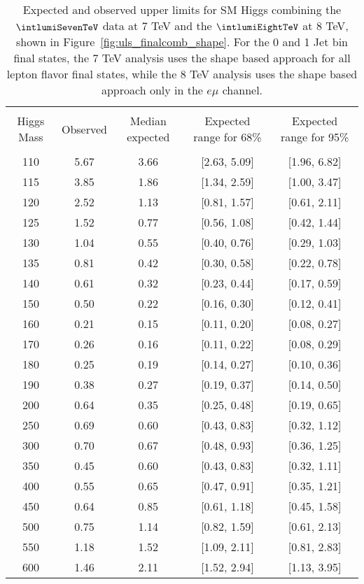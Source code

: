 \begin{table}[!htbp]
\begin{center}
\begin{tabular}{c c c c c}
\hline
\vspace{-3mm} && \\
Higgs Mass & Observed  & Median expected & Expected range for 68\% & Expected range for 95\%   \\
\hline
\vspace{-3mm} && \\
110 & 5.67 & 3.66 & [2.63, 5.09] & [1.96, 6.82] \\
115 & 3.85 & 1.86 & [1.34, 2.59] & [1.00, 3.47] \\
120 & 2.52 & 1.13 & [0.81, 1.57] & [0.61, 2.11] \\
125 & 1.52 & 0.77 & [0.56, 1.08] & [0.42, 1.44] \\
130 & 1.04 & 0.55 & [0.40, 0.76] & [0.29, 1.03] \\
135 & 0.81 & 0.42 & [0.30, 0.58] & [0.22, 0.78] \\
140 & 0.61 & 0.32 & [0.23, 0.44] & [0.17, 0.59] \\
150 & 0.50 & 0.22 & [0.16, 0.30] & [0.12, 0.41] \\
160 & 0.21 & 0.15 & [0.11, 0.20] & [0.08, 0.27] \\
170 & 0.26 & 0.16 & [0.11, 0.22] & [0.08, 0.29] \\
180 & 0.25 & 0.19 & [0.14, 0.27] & [0.10, 0.36] \\
190 & 0.38 & 0.27 & [0.19, 0.37] & [0.14, 0.50] \\
200 & 0.64 & 0.35 & [0.25, 0.48] & [0.19, 0.65] \\
250 & 0.69 & 0.60 & [0.43, 0.83] & [0.32, 1.12] \\
300 & 0.70 & 0.67 & [0.48, 0.93] & [0.36, 1.25] \\
350 & 0.45 & 0.60 & [0.43, 0.83] & [0.32, 1.11] \\
400 & 0.55 & 0.65 & [0.47, 0.91] & [0.35, 1.21] \\
450 & 0.64 & 0.85 & [0.61, 1.18] & [0.45, 1.58] \\
500 & 0.75 & 1.14 & [0.82, 1.59] & [0.61, 2.13] \\
550 & 1.18 & 1.52 & [1.09, 2.11] & [0.81, 2.83] \\
600 & 1.46 & 2.11 & [1.52, 2.94] & [1.13, 3.95] \\
\hline
\end{tabular}
\caption{\fixme Expected and observed upper limits for SM Higgs combining the $\intlumiSevenTeV$ data 
at 7 TeV and the $\intlumiEightTeV$ at 8 TeV, shown in Figure~\ref{fig:uls_finalcomb_shape}.
For the 0 and 1 Jet bin final states, the 7 TeV analysis uses the shape based approach for all 
lepton flavor final states, while the 8 TeV analysis uses the shape based approach only 
in the $e\mu$ channel. }
\label{tab:uls_finalcomb_shape}
\end{center}
\end{table} 




